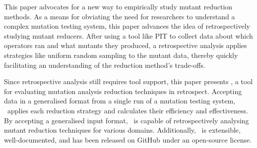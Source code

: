 
This paper advocates for a new way to empirically study mutant reduction methods. As a means for obviating the need for
researchers to understand a complex mutation testing system, this paper advances the idea of retrospectively studying
mutant reducers.  After using a tool like PIT to collect data about which operators ran and what mutants they produced,
a retrospective analysis applies strategies like uniform random sampling to the mutant data, thereby quickly
facilitating an understanding of the reduction method's trade-offs.


Since retrospective analysis still requires tool support, this paper presents \mr, a tool for evaluating mutation
analysis reduction techniques in retrospect. Accepting data in a generalised format from a single run of a mutation
testing system, \mr~applies each reduction strategy and calculates their efficiency and effectiveness.  By accepting a
generalised input format, \mr~is capable of retrospectively analysing mutant reduction techniques for various domains.
Additionally, \mr~is extensible, well-documented, and has been released on GitHub under an open-source license.







